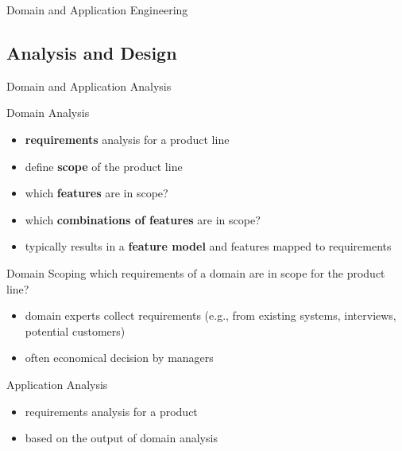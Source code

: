 \begin{frame}[t,label=DomainAndApplicationEngineeringDiagram]{Domain and Application Engineering}
	\vspace{-16pt}
	
\end{frame}

\subsection{Analysis and Design}
\begin{frame}{Domain and Application Analysis}\small
	\begin{fancycolumns}[T,columns=3,widths={10,49}]
		\renewcommand{\projectcartoonwidth}{1}
	\nextcolumn
		\begin{definition}{Domain Analysis}
			\begin{itemize}
				\item \textbf{requirements} analysis for a product line
				\item define \textbf{scope} of the product line
				\item which \textbf{features} are in scope?
				\item which \textbf{combinations of features} are in scope?
				\item[$\Rightarrow$] typically results in a \textbf{feature model} and features mapped to requirements
			\end{itemize}
		\end{definition}
		\begin{definition}{Domain Scoping}
			which requirements of a domain are in scope for the product line?
			\begin{itemize}
				\item domain experts collect requirements (e.g., from existing systems, interviews, potential customers)
				\item often economical decision by managers
			\end{itemize}
		\end{definition}
	\nextcolumn
		\begin{definition}{Application Analysis}
			\begin{itemize}
				\item requirements analysis for a product
				\item based on the output of domain analysis

\end{itemize}
\end{definition}
\end{fancycolumns}
\end{frame}
